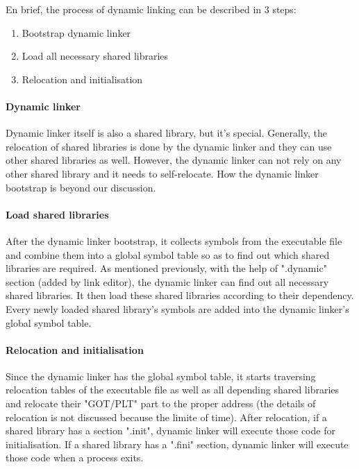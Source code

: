         
    En brief, the process of dynamic linking can be described in 3 steps:
        \begin{enumerate}
            \item Bootstrap dynamic linker
            \item Load all necessary shared libraries
            \item Relocation and initialisation
        \end{enumerate}
      
        \paragraph{Dynamic linker}        
        Dynamic linker itself is also a shared library, but it's special. Generally, the relocation of shared libraries is done by the dynamic linker and they can use other shared libraries as well\cite{LAL-00}. However, the dynamic linker can not rely on any other shared library and it needs to self-relocate. How the dynamic linker bootstrap is beyond our discussion.
        
        \paragraph{Load shared libraries}
        After the dynamic linker bootstrap, it collects symbols from the executable file and combine them into a global symbol table so as to find out which shared libraries are required\cite{LAL-00}. As mentioned previously, with the help of ".dynamic" section (added by link editor), the dynamic linker can find out all necessary shared libraries. It then load these shared libraries according to their dependency. Every newly loaded shared library's symbols are added into the dynamic linker's global symbol table\cite{LAL-00}.
    
        \paragraph{Relocation and initialisation}
        Since the dynamic linker has the global symbol table, it starts traversing relocation tables of the executable file as well as all depending shared libraries and relocate their "GOT/PLT" part to the proper address (the details of relocation is not discussed because the limite of time)\cite{LAL-00}. After relocation, if a shared library has a section ".init", dynamic linker will execute those code for initialisation. If a shared library has a ".fini" section, dynamic linker will execute those code when a process exits\cite{LAL-00}.  
        
